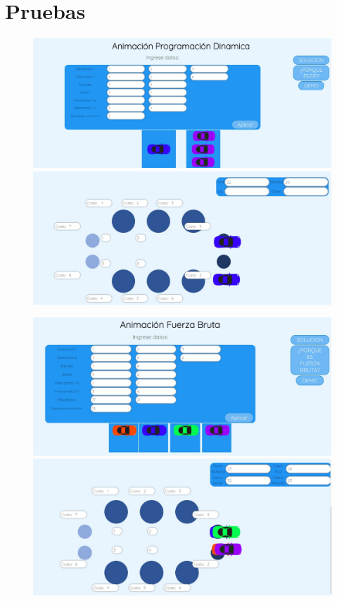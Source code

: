 \documentclass[12 pt]{report}
\begin{document}
\chapter{Pruebas}
\begin{figure}[h!]
  \centering
  \includegraphics[scale = 0.4]{paginadp1}
  \includegraphics[scale = 0.4]{paginadp2}
\end{figure}
\begin{figure}[h!]
  \centering
  \includegraphics[scale = 0.4]{paginafb1}
  \includegraphics[scale = 0.4]{paginafb2}
\end{figure}
\end{document}
